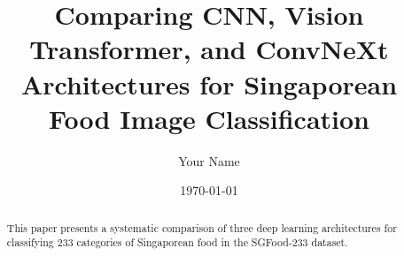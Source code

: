 \documentclass[11pt,a4paper]{article}
\title{Comparing CNN, Vision Transformer, and ConvNeXt Architectures for Singaporean Food Image Classification}
\author{Your Name}
\date{\today}
\begin{document}
\maketitle

\begin{abstract}
This paper presents a systematic comparison of three deep learning architectures for classifying 233 categories of Singaporean food in the SGFood-233 dataset.
\end{abstract}



% 
% 
\end{document}

